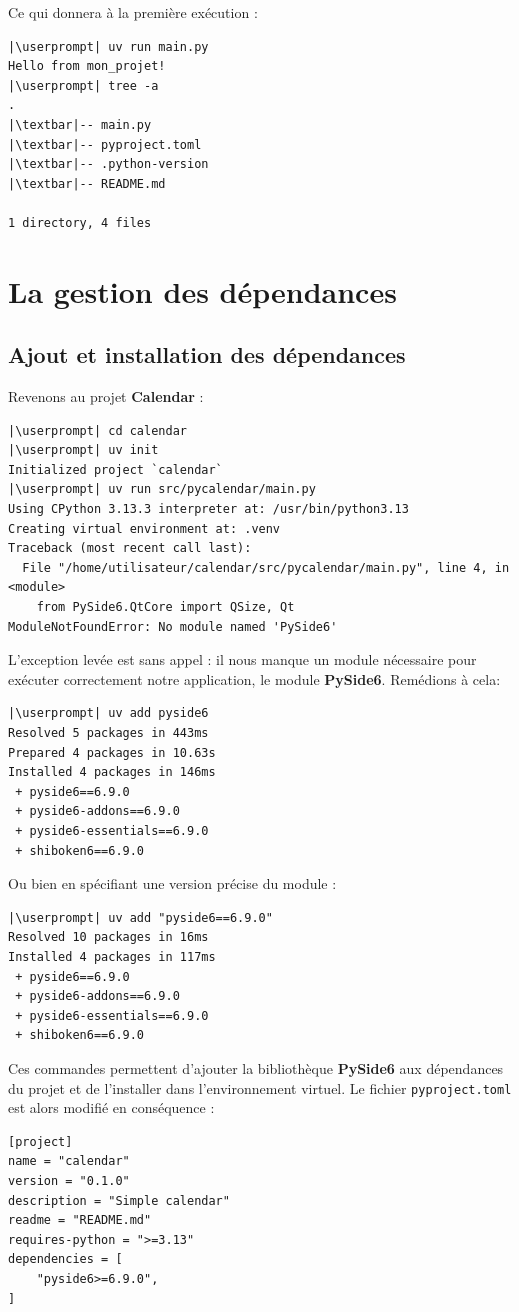 Ce qui donnera à la première exécution :
\begin{lstlisting}[style=bash]
|\userprompt| uv run main.py
Hello from mon_projet!
|\userprompt| tree -a
.
|\textbar|-- main.py
|\textbar|-- pyproject.toml
|\textbar|-- .python-version
|\textbar|-- README.md

1 directory, 4 files
\end{lstlisting}

\section{La gestion des dépendances}
\subsection*{Ajout et installation des dépendances}
Revenons au projet \textbf{Calendar} :
\begin{lstlisting}[style=bash]
|\userprompt| cd calendar
|\userprompt| uv init
Initialized project `calendar`
|\userprompt| uv run src/pycalendar/main.py
Using CPython 3.13.3 interpreter at: /usr/bin/python3.13
Creating virtual environment at: .venv
Traceback (most recent call last):
  File "/home/utilisateur/calendar/src/pycalendar/main.py", line 4, in <module>
    from PySide6.QtCore import QSize, Qt
ModuleNotFoundError: No module named 'PySide6'
\end{lstlisting}

L'exception levée est sans appel : il nous manque un module nécessaire pour exécuter correctement notre application, le module \textbf{PySide6}. Remédions à cela:
\begin{lstlisting}[style=bash]
|\userprompt| uv add pyside6
Resolved 5 packages in 443ms
Prepared 4 packages in 10.63s
Installed 4 packages in 146ms
 + pyside6==6.9.0
 + pyside6-addons==6.9.0
 + pyside6-essentials==6.9.0
 + shiboken6==6.9.0
\end{lstlisting}

Ou bien en spécifiant une version précise du module :
\begin{lstlisting}[style=bash]
|\userprompt| uv add "pyside6==6.9.0"
Resolved 10 packages in 16ms
Installed 4 packages in 117ms
 + pyside6==6.9.0
 + pyside6-addons==6.9.0
 + pyside6-essentials==6.9.0
 + shiboken6==6.9.0
\end{lstlisting}

Ces commandes permettent d'ajouter la bibliothèque \textbf{PySide6} aux dépendances du projet et de l'installer dans l'environnement virtuel. Le fichier \texttt{pyproject.toml} est alors modifié en conséquence :
\begin{lstlisting}[style=file]
[project]
name = "calendar"
version = "0.1.0"
description = "Simple calendar"
readme = "README.md"
requires-python = ">=3.13"
dependencies = [
    "pyside6>=6.9.0",
]
\end{lstlisting}

